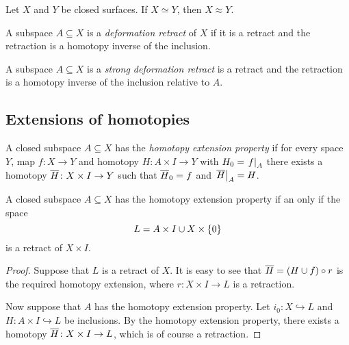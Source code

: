 \begin{izrek}
Let $X$ and $Y$ be closed surfaces. If $X \simeq Y$, then
$X \approx Y$.
\end{izrek}

\begin{definicija}
A subspace $A \subseteq X$ is a
\emph{deformation retract} of $X$ if it
is a retract and the retraction is a homotopy inverse of the
inclusion.
\end{definicija}

\begin{definicija}
A subspace $A \subseteq X$ is a
\emph{strong deformation retract}
is a retract and the retraction is a homotopy inverse of the
inclusion relative to $A$.
\end{definicija}

\newpage

\subsection{Extensions of homotopies}


\begin{definicija}
A closed subspace $A \subseteq X$ has the
\emph{homotopy extension property}
if for every space $Y$, map $f \colon X \to Y$ and homotopy
$H \colon A \times I \to Y$ with $H_0 = \left. f\right|_{A}^{}$ there exists
a homotopy $\overline{H} \colon X \times I \to Y$ such that
$\overline{H}_0 = f$ and $\left. \overline{H}\right|_{A}^{} = H$.
\end{definicija}

\begin{trditev}
A closed subspace $A \subseteq X$ has the homotopy extension
property if an only if the space
\[
L = A \times I \cup X \times \left\{0\right\}
\]
is a retract of $X \times I$.
\end{trditev}

\begin{proof}
Suppose that $L$ is a retract of $X$. It is easy to see that
$\overline{H} = (H \cup f) \circ r$ is the required homotopy
extension, where $r \colon X \times I \to L$ is a retraction.

Now suppose that $A$ has the homotopy extension property. Let
$i_0 \colon X \hookrightarrow L$ and
$H \colon A \times I \hookrightarrow L$ be inclusions. By the
homotopy extension property, there exists a homotopy
$\overline{H} \colon X \times I \to L$, which is of course a
retraction.
\end{proof}

